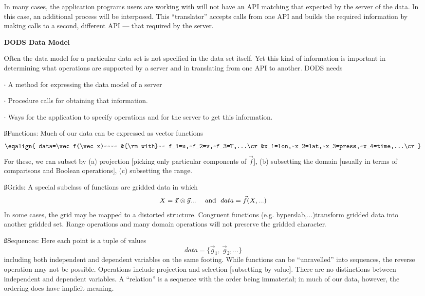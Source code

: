 In many cases, the application programs users are working with will
not have an API matching that expected by the server of the data. In
this case, an additional process will be interposed. This
``translator'' accepts calls from one API and builds the required
information by making calls to a second, different API --- that
required by the server.

\vfill\eject
\centerline{\bf DODS Data Model}

Often the data model for a particular data set is not specified in the
data set itself. Yet this kind of information is important in
determining what operations are supported by a server and in
translating from one API to another. DODS needs

\item{$\cdot$} A method for expressing the data model of a server

\item{$\cdot$} Procedure calls for obtaining that information.

\item{$\cdot$} Ways for the application to specify operations and for
the server to get this information.


\vfill\eject


\ss{Functions:} Much of our data can be expressed as vector functions
$$
\eqalign{
data=\vec f(\vec x)~~~~ &{\rm with}~~
f_1=u,~f_2=v,~f_3=T,...\cr
&x_1=lon,~x_2=lat,~x_3=press,~x_4=time,...\cr
}
$$
For these, we can subset by (a) projection [picking only particular
components of $\vec f$], (b) subsetting the domain [usually in terms
of comparisons and Boolean operations], (c) subsetting the range.

\ss{Grids:} A special subclass of functions are gridded data in which
$$
X=\vec x \otimes \vec y...~~~~ {\rm and}~~ data=\vec f(X,...)
$$
In some cases, the grid may be mapped to a distorted structure.
Congruent functions (e.g. hyperslab,...)transform gridded data into
another gridded set. Range operations and many domain operations will
not preserve the gridded character.

\vfill\eject
\ss{Sequences:} Here each point is a tuple of values
$$
data=\{\vec g_1,~ \vec g_2,...\}
$$
including both independent and dependent variables on the same
footing. While functions can be ``unravelled'' into sequences, the
reverse operation may not be possible. Operations include projection
and selection [subsetting by value]. There are no distinctions between
independent and dependent variables. A ``relation'' is a sequence with
the order being immaterial; in much of our data, however, the ordering
does have implicit meaning.

